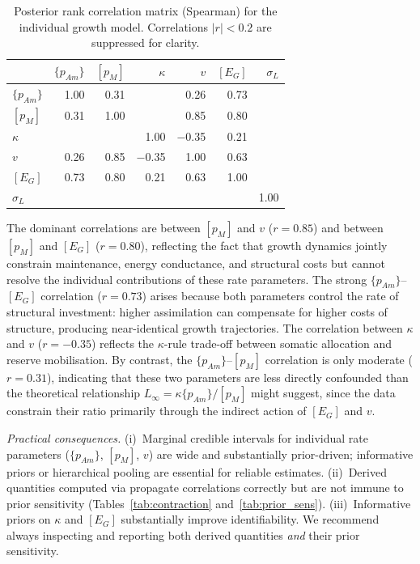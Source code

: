 \documentclass[article,shortnames]{jss}
\newcommand{\pAm}{\{p_{Am}\}}
\newcommand{\pM}{[p_M]}
\newcommand{\EG}{[E_G]}
\begin{document}
\begin{table}[t!]
\centering
\caption{Posterior rank correlation matrix (Spearman) for the
  individual growth model.  Correlations $|r| < 0.2$ are suppressed
  for clarity.}
\label{tab:corr}
\begin{tabular}{lrrrrrr}
\toprule
         & $\pAm$ & $\pM$ & $\kappa$ & $v$ & $\EG$ & $\sigma_L$ \\
\midrule
$\pAm$   & 1.00 & 0.31 &      & 0.26 & 0.73 &       \\
$\pM$    & 0.31 & 1.00 &      & 0.85 & 0.80 &       \\
$\kappa$ &      &      & 1.00 &$-$0.35&0.21 &       \\
$v$      & 0.26 & 0.85 &$-$0.35& 1.00 & 0.63 &       \\
$\EG$    & 0.73 & 0.80 & 0.21 & 0.63 & 1.00 &       \\
$\sigma_L$ &&    &      &      &      & 1.00  \\
\bottomrule
\end{tabular}
\end{table}


The dominant correlations are between $\pM$ and $v$ ($r = 0.85$)
and between $\pM$ and $\EG$ ($r = 0.80$), reflecting the fact that
growth dynamics jointly constrain maintenance, energy conductance,
and structural costs but cannot resolve the individual contributions
of these rate parameters.  The strong $\pAm$--$\EG$ correlation
($r = 0.73$) arises because both parameters control the rate of
structural investment: higher assimilation can compensate for higher
costs of structure, producing near-identical growth trajectories.
The correlation between $\kappa$ and $v$ ($r = -0.35$) reflects
the $\kappa$-rule trade-off between somatic allocation and reserve
mobilisation.  By contrast, the $\pAm$--$\pM$ correlation is only
moderate ($r = 0.31$), indicating that these two parameters are less
directly confounded than the theoretical relationship
$L_\infty = \kappa \pAm / \pM$ might suggest, since the data constrain
their ratio primarily through the indirect action of $\EG$ and $v$.

\emph{Practical consequences.}  (i)~Marginal credible intervals for
individual rate parameters ($\pAm$, $\pM$, $v$) are wide and
substantially prior-driven; informative priors or hierarchical
pooling are essential for reliable estimates.
(ii)~Derived quantities computed via  propagate
correlations correctly but are not immune to prior sensitivity
(Tables~\ref{tab:contraction} and~\ref{tab:prior_sens}).
(iii)~Informative priors on $\kappa$ and $\EG$ substantially improve
identifiability.  We recommend always inspecting
 and reporting both derived
quantities \emph{and} their prior sensitivity.
\end{document}
